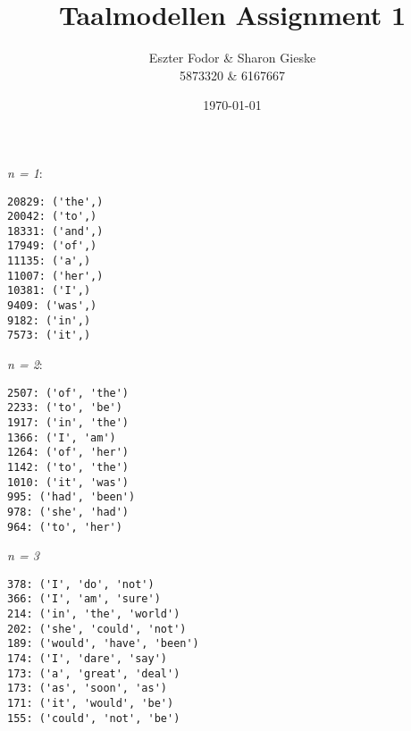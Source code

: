 \documentclass[11pt, a4paper]{article}
\title{Taalmodellen Assignment 1}
\author{Eszter Fodor \& Sharon Gieske \\ 5873320 \& 6167667}
\date{\today}
\begin{document}
\maketitle

\section{}
\textit{n = 1}:
\begin{verbatim}
20829: ('the',)
20042: ('to',)
18331: ('and',)
17949: ('of',)
11135: ('a',)
11007: ('her',)
10381: ('I',)
9409: ('was',)
9182: ('in',)
7573: ('it',)
\end{verbatim}

\noindent \textit{n = 2}:
\begin{verbatim}
2507: ('of', 'the')
2233: ('to', 'be')
1917: ('in', 'the')
1366: ('I', 'am')
1264: ('of', 'her')
1142: ('to', 'the')
1010: ('it', 'was')
995: ('had', 'been')
978: ('she', 'had')
964: ('to', 'her')
\end{verbatim}

\noindent \textit{n = 3}
\begin{verbatim}
378: ('I', 'do', 'not')
366: ('I', 'am', 'sure')
214: ('in', 'the', 'world')
202: ('she', 'could', 'not')
189: ('would', 'have', 'been')
174: ('I', 'dare', 'say')
173: ('a', 'great', 'deal')
173: ('as', 'soon', 'as')
171: ('it', 'would', 'be')
155: ('could', 'not', 'be')
\end{verbatim}
\end{document}
